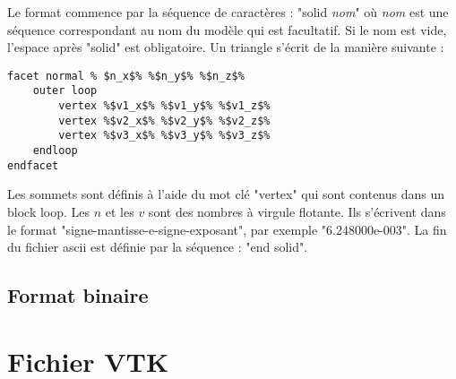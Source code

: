 Le format commence par la séquence de caractères : "solid \textit{nom}" où \textit{nom} est une séquence correspondant au nom du modèle qui est facultatif.
Si le nom est vide, l'espace après "solid" est obligatoire.
Un triangle s'écrit de la manière suivante :
\begin{lstlisting}[frame=single, escapechar=\%]
facet normal % $n_x$% %$n_y$% %$n_z$%
    outer loop
        vertex %$v1_x$% %$v1_y$% %$v1_z$%
        vertex %$v2_x$% %$v2_y$% %$v2_z$%
        vertex %$v3_x$% %$v3_y$% %$v3_z$%
    endloop
endfacet
\end{lstlisting}
Les sommets sont définis à l'aide du mot clé "vertex" qui sont contenus dans un block loop. Les $n$ et les $v$ sont des nombres à virgule flotante.
Ils s'écrivent dans le format "signe-mantisse-e-signe-exposant", par exemple "6.248000e-003".
La fin du fichier ascii est définie par la séquence : "end solid".

\subsection{Format binaire}

\section{Fichier VTK}

